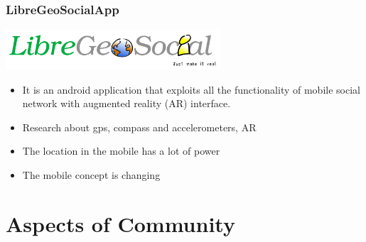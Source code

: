 \documentclass{beamer}
\begin{document}
\begin{frame}
\frametitle{LibreGeoSocialApp}

\begin{center}
  \includegraphics[height=1.5cm]{figs/LibreGeoSocialApp}
\end{center}
\begin{itemize}
\item It is an android application that exploits all the functionality
  of mobile social network with augmented reality (AR) interface.
\item Research about gps, compass and accelerometers, AR
\item The location in the mobile has a lot of power
\item The mobile concept is changing
\end{itemize}

\begin{center}

\end{center}

\end{frame}


%
%
%


\section{Aspects of Community}
\end{document}
